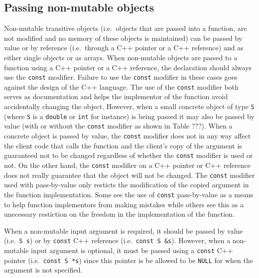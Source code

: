 %
\subsection{Passing non-mutable objects}
%

Non-mutable transitive objects (i.e.~objects that are passed into a
function, are not modified and no memory of these objects is
maintained) can be passed by value or by reference (i.e.~through a C++
pointer or a C++ reference) and as either single objects or as arrays.
When non-mutable objects are passed to a function using a C++ pointer
or a C++ reference, the declaration should always use the
{}\texttt{const} modifier.  Failure to use the {}\texttt{const}
modifier in these cases goes against the design of the C++ language.
The use of the {}\texttt{const} modifier both serves as documentation
and helps the implementor of the function avoid accidentally changing
the object.  However, when a small concrete object of type
{}\texttt{S} (where {}\texttt{S} is a {}\texttt{double} or
{}\texttt{int} for instance) is being passed it may also be passed by
value (with or without the {}\texttt{const} modifier as shown in Table
???).  When a concrete object is passed by value, the {}\texttt{const}
modifier does not in any way affect the client code that calls the
function and the client's copy of the argument is guaranteed not to be
changed regardless of whether the {}\texttt{const} modifier is used or
not.  On the other hand, the {}\texttt{const} modifier on a C++
pointer or C++ reference does not really guarantee that the object
will not be changed.  The {}\texttt{const} modifier used with
pass-by-value only resticts the modification of the copied argument in
the function implementation.  Some see the use of {}\texttt{const}
pass-by-value as a means to help function implementors from making
mistakes while others see this as a unecessary restiction on the
freedom in the implementation of the function.

When a non-mutable input argument is required, it should be passed by
value (i.e.~{}\texttt{S s}) or by {}\texttt{const} C++ reference
(i.e.~{}\texttt{const S \&s}).  However, when a non-mutable input
argument is optional, it must be passed using a {}\texttt{const} C++
pointer (i.e.~{}\texttt{const S *s}) since this pointer is be allowed
to be {}\texttt{NULL} for when the argument is not specified.

